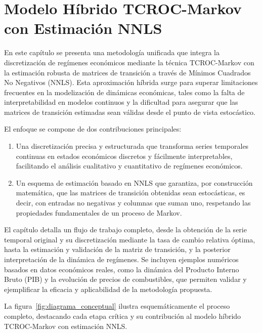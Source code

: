 \chapter{Modelo Híbrido TCROC-Markov con Estimación NNLS}
\label{cap:tcroc_hibrido_integrado}

En este capítulo se presenta una metodología unificada que integra la discretización de regímenes económicos mediante la técnica TCROC-Markov con la estimación robusta de matrices de transición a través de Mínimos Cuadrados No Negativos (NNLS). Esta aproximación híbrida surge para superar limitaciones frecuentes en la modelización de dinámicas económicas, tales como la falta de interpretabilidad en modelos continuos y la dificultad para asegurar que las matrices de transición estimadas sean válidas desde el punto de vista estocástico.

El enfoque se compone de dos contribuciones principales:

\begin{enumerate}[label=\roman*]
    \item Una discretización precisa y estructurada que transforma series temporales continuas en estados económicos discretos y fácilmente interpretables, facilitando el análisis cualitativo y cuantitativo de regímenes económicos.
    \item Un esquema de estimación basado en NNLS que garantiza, por construcción matemática, que las matrices de transición obtenidas sean estocásticas, es decir, con entradas no negativas y columnas que suman uno, respetando las propiedades fundamentales de un proceso de Markov.
\end{enumerate}

El capítulo detalla un flujo de trabajo completo, desde la obtención de la serie temporal original y su discretización mediante la tasa de cambio relativa óptima, hasta la estimación y validación de la matriz de transición, y la posterior interpretación de la dinámica de regímenes. Se incluyen ejemplos numéricos basados en datos económicos reales, como la dinámica del Producto Interno Bruto (PIB) y la evolución de precios de combustibles, que permiten validar y ejemplificar la eficacia y aplicabilidad de la metodología propuesta.

La figura~\ref{fig:diagrama_conceptual} ilustra esquemáticamente el proceso completo, destacando cada etapa crítica y su contribución al modelo híbrido TCROC-Markov con estimación NNLS.

